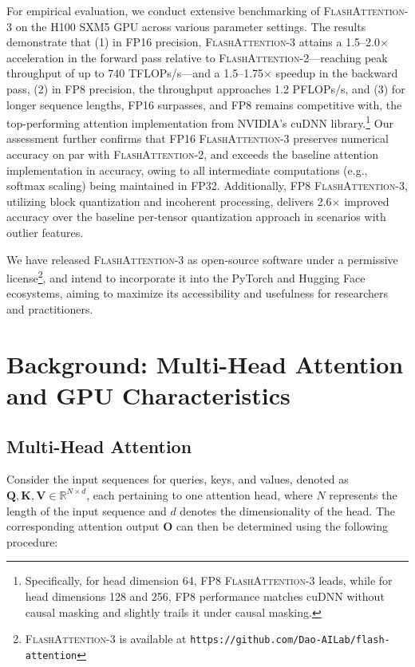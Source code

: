 For empirical evaluation, we conduct extensive benchmarking of \textsc{FlashAttention-3} on the H100 SXM5 GPU across various parameter settings. The results demonstrate that (1) in FP16 precision, \textsc{FlashAttention-3} attains a 1.5–2.0$\times$ acceleration in the forward pass relative to \textsc{FlashAttention-2}—reaching peak throughput of up to 740 TFLOPs/s—and a 1.5–1.75$\times$ speedup in the backward pass, (2) in FP8 precision, the throughput approaches 1.2 PFLOPs/s, and (3) for longer sequence lengths, FP16 surpasses, and FP8 remains competitive with, the top-performing attention implementation from NVIDIA's cuDNN library.\footnote{Specifically, for head dimension 64, FP8 \textsc{FlashAttention-3} leads, while for head dimensions 128 and 256, FP8 performance matches cuDNN without causal masking and slightly trails it under causal masking.} Our assessment further confirms that FP16 \textsc{FlashAttention-3} preserves numerical accuracy on par with \textsc{FlashAttention-2}, and exceeds the baseline attention implementation in accuracy, owing to all intermediate computations (e.g., softmax scaling) being maintained in FP32. Additionally, FP8 \textsc{FlashAttention-3}, utilizing block quantization and incoherent processing, delivers 2.6$\times$ improved accuracy over the baseline per-tensor quantization approach in scenarios with outlier features.

We have released \textsc{FlashAttention-3} as open-source software under a permissive license\footnote{\textsc{FlashAttention-3}
  is available at \texttt{https://github.com/Dao-AILab/flash-attention}}, and intend to incorporate it into the PyTorch and Hugging Face ecosystems, aiming to maximize its accessibility and usefulness for researchers and practitioners.

\section{Background: Multi-Head Attention and GPU Characteristics}
\label{sec:background}

\subsection{Multi-Head Attention}
\label{subsec:multi_head_attn}

Consider the input sequences for queries, keys, and values, denoted as $\mathbf{Q}, \mathbf{K}, \mathbf{V} \in \mathbb{R}^{N \times d}$, each pertaining to one attention head, where $N$ represents the length of the input sequence and $d$ denotes the dimensionality of the head. The corresponding attention output $\mathbf{O}$ can then be determined using the following procedure:

